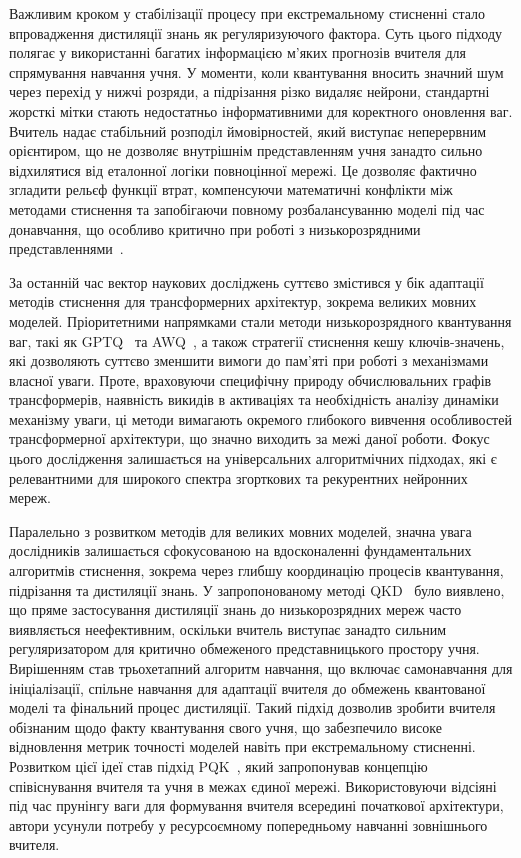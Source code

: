\documentclass{pma-mthesis}
\begin{document}
Важливим кроком у стабілізації процесу при екстремальному стисненні стало впровадження дистиляції знань як регуляризуючого фактора. Суть цього підходу полягає у використанні багатих інформацією м’яких прогнозів вчителя для спрямування навчання учня. У моменти, коли квантування вносить значний шум через перехід у нижчі розряди, а підрізання різко видаляє нейрони, стандартні жорсткі мітки стають недостатньо інформативними для коректного оновлення ваг. Вчитель надає стабільний розподіл ймовірностей, який виступає неперервним орієнтиром, що не дозволяє внутрішнім представленням учня занадто сильно відхилятися від еталонної логіки повноцінної мережі. Це дозволяє фактично згладити рельєф функції втрат, компенсуючи математичні конфлікти між методами стиснення та запобігаючи повному розбалансуванню моделі під час донавчання, що особливо критично при роботі з низькорозрядними представленнями~\cite{kim2020qkd, polino2018model}.

За останній час вектор наукових досліджень суттєво змістився у бік адаптації методів стиснення для трансформерних архітектур, зокрема великих мовних моделей. Пріоритетними напрямками стали методи низькорозрядного квантування ваг, такі як GPTQ~\cite{frantar2023gptq} та AWQ~\cite{lin2024awq}, а також стратегії стиснення кешу ключів-значень, які дозволяють суттєво зменшити вимоги до пам'яті при роботі з механізмами власної уваги. Проте, враховуючи специфічну природу обчислювальних графів трансформерів, наявність викидів в активаціях та необхідність аналізу динаміки механізму уваги, ці методи вимагають окремого глибокого вивчення особливостей трансформерної архітектури, що значно виходить за межі даної роботи. Фокус цього дослідження залишається на універсальних алгоритмічних підходах, які є релевантними для широкого спектра згорткових та рекурентних нейронних мереж.

Паралельно з розвитком методів для великих мовних моделей, значна увага дослідників залишається сфокусованою на вдосконаленні фундаментальних алгоритмів стиснення, зокрема через глибшу координацію процесів квантування, підрізання та дистиляції знань. У запропонованому методі QKD~\cite{kim2020qkd} було виявлено, що пряме застосування дистиляції знань до низькорозрядних мереж часто виявляється неефективним, оскільки вчитель виступає занадто сильним регуляризатором для критично обмеженого представницького простору учня. Вирішенням став трьохетапний алгоритм навчання, що включає самонавчання для ініціалізації, спільне навчання для адаптації вчителя до обмежень квантованої моделі та фінальний процес дистиляції. Такий підхід дозволив зробити вчителя обізнаним щодо факту квантування свого учня, що забезпечило високе відновлення метрик точності моделей навіть при екстремальному стисненні. Розвитком цієї ідеї став підхід PQK~\cite{kim2021pqk}, який запропонував концепцію співіснування вчителя та учня в межах єдиної мережі. Використовуючи відсіяні під час прунінгу ваги для формування вчителя всередині початкової архітектури, автори усунули потребу у ресурсоємному попередньому навчанні зовнішнього вчителя.
\end{document}
